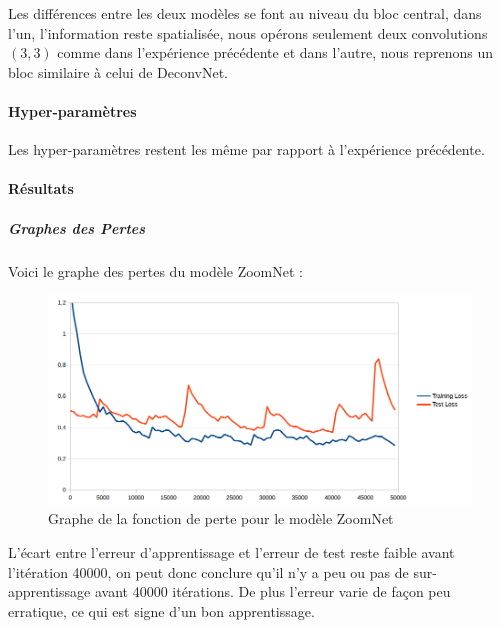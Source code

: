 \documentclass[a4paper, 11pt]{report}
\begin{document}
Les différences entre les deux modèles se font au niveau du bloc central, dans l'un, l'information reste spatialisée, nous opérons seulement deux convolutions $(3, 3)$ comme dans l'expérience précédente et dans l'autre, nous reprenons un bloc similaire à celui de DeconvNet.
\paragraph{Hyper-paramètres}
Les hyper-paramètres restent les même par rapport à l'expérience précédente.
\paragraph{Résultats}
\subparagraph{Graphes des Pertes}
Voici le graphe des pertes du modèle ZoomNet :
\begin{figure}[H]
	\begin{center}
		\includegraphics[scale=0.6]{Images/Losses_ZoomNet.png}
		\caption{Graphe de la fonction de perte pour le modèle ZoomNet}
	\end{center}
\end{figure}
L'écart entre l'erreur d'apprentissage et l'erreur de test reste faible avant l'itération 40000, on peut donc conclure qu'il n'y a peu ou pas de sur-apprentissage avant 40000 itérations.
De plus l'erreur varie de façon peu erratique, ce qui est signe d'un bon apprentissage.
\end{document}
